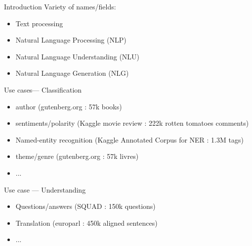 \begin{frame}{Introduction}
  Variety of names/fields:
  \begin{itemize}
    \item Text processing
    \item Natural Language Processing (NLP)
    \item Natural Language Understanding (NLU)
    \item Natural Language Generation (NLG)
  \end{itemize}

\end{frame}

\begin{frame}{Use cases--- Classification}
  \begin{itemize}
  \item author (gutenberg.org : 57k books)
  \item sentiments/polarity (Kaggle movie review : 222k rotten tomatoes comments)
  \item Named-entity recognition (Kaggle Annotated Corpus for NER : 1.3M tags)
  \item theme/genre (gutenberg.org : 57k livres)
  \item ...
  \end{itemize}
\end{frame}

\begin{frame}{Use case --- Understanding}
  \begin{itemize}
  \item Questions/answers (SQUAD : 150k questions)
  \item Translation (europarl : 450k aligned sentences)
  \item ...
  \end{itemize}
\end{frame}

